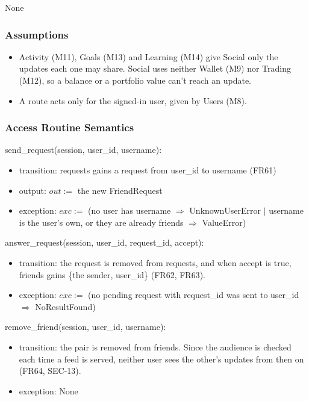 \documentclass[12pt, titlepage]{article}
\begin{document}
None

\subsubsection{Assumptions}

\begin{itemize}
\item Activity (M11), Goals (M13) and Learning (M14) give Social only the
  updates each one may share. Social uses neither Wallet (M9) nor Trading
  (M12), so a balance or a portfolio value can't reach an update.
\item A route acts only for the signed-in user, given by Users (M8).
\end{itemize}

\subsubsection{Access Routine Semantics}

\noindent send\_request(session, user\_id, username):
\begin{itemize}
\item transition: requests gains a request from user\_id to username (FR61)
\item output: $out :=$ the new FriendRequest
\item exception: $exc :=$ (no user has username $\Rightarrow$
  UnknownUserError $|$ username is the user's own, or they are already friends
  $\Rightarrow$ ValueError)
\end{itemize}

\noindent answer\_request(session, user\_id, request\_id, accept):
\begin{itemize}
\item transition: the request is removed from requests, and when accept is
  true, friends gains \{the sender, user\_id\} (FR62, FR63).
\item exception: $exc :=$ (no pending request with request\_id was sent to
  user\_id $\Rightarrow$ NoResultFound)
\end{itemize}

\noindent remove\_friend(session, user\_id, username):
\begin{itemize}
\item transition: the pair is removed from friends. Since the audience is
  checked each time a feed is served, neither user sees the other's updates
  from then on (FR64, SEC-13).
\item exception: None
\end{itemize}
\end{document}
